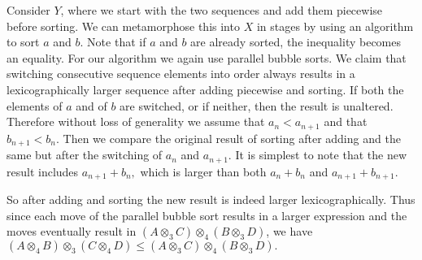 \documentclass{tac}
\begin{document}
{\begin{enumerate}
Consider $Y$, where we start with the two sequences and add them 
piecewise before sorting. We can metamorphose this
into $X$ in stages by using an algorithm to sort $a$ and $b$. Note that if $a$ and $b$ are
already sorted, the inequality becomes an equality.
For our algorithm we again use parallel bubble sorts.  We claim that switching consecutive 
sequence elements into order
always results in a lexicographically larger
sequence after adding piecewise and sorting. If both the elements of $a$ and of $b$ are switched, or if neither,
then the result is unaltered. Therefore without loss of generality we assume that $a_n < a_{n+1}$
and that $b_{n+1} < b_n.$ Then we compare the original
result of sorting after adding and the same but after the switching of $a_n$ and
$a_{n+1}.$ It is simplest to note that the new result includes $a_{n+1} + b_n,$ which is larger than
both $a_n + b_n$ and $a_{n+1} + b_{n+1}.$ 

So after adding
and sorting the new result is indeed larger lexicographically. 
Thus since each move of the parallel bubble sort results in a larger expression  and the moves
eventually result in $(A \otimes_3 C)\otimes_4 (B \otimes_3 D)$, we have $(A \otimes_4 B)\otimes_3(C \otimes_4 D) \le(A \otimes_3 C)\otimes_4 (B \otimes_3 D).$








\end{enumerate}}
\end{document}
